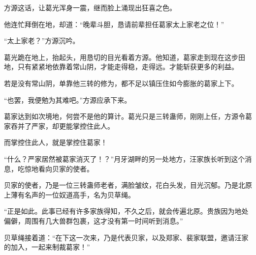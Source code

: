 \begin{this_body}
方源这话，让葛光浑身一震，继而脸上涌现出狂喜之色。

他连忙拜倒在地，却道：“晚辈斗胆，恳请前辈担任葛家太上家老之位！”

“太上家老？”方源沉吟。

葛光跪在地上，抬起头，用恳切的目光看着方源。他知道，葛家走到现在这步田地，只有紧紧地依靠着常山阴，才能走得稳，走得远。才能斩获更多的利益。

若是没有常山阴，单靠他三转的修为，都不足以镇压住如今膨胀的葛家上下。

“也罢，我便勉为其难吧。”方源应承下来。

葛家达到如次境地，何尝不是他的算计。葛光只是三转蛊师，刚刚上任，方源令葛家吞并了严家，却更能掌控住此人。

而掌控住此人，就是掌控住葛家！

“什么？严家居然被葛家消灭了！？”月牙湖畔的另一处地方，汪家族长听到这个消息，吃惊地看向贝家的使者。

贝家的使者，乃是一位三转蛊师老者，满脸皱纹，花白头发，目光沉郁。乃是北原上薄有名声的一位奴道高手，名为贝草绳。

“正是如此。此事已经有许多家族得知，不久之后，就会传遍北原。贵族因为地处偏僻，周围有几大兽群包裹，这才没有第一时间听到消息。”

贝草绳接着道：“在下这一次来，乃是代表贝家，以及郑家、裴家联盟，邀请汪家的加入，一起来制裁葛家！”

\end{this_body}

